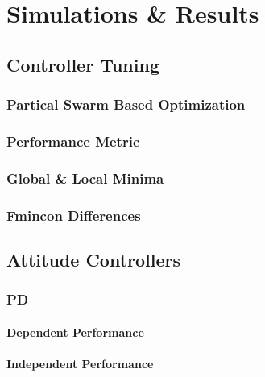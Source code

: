 \chapter{Simulations \& Results}
\label{ch:simulation}
\section{Controller Tuning}
\label{sec:simulation.tuning}
\subsection{Partical Swarm Based Optimization}
\label{subsec:simulation.tuning.pso}
\subsection{Performance Metric}
\label{subsec:simulation.tuning.metric}
\subsection{Global \& Local Minima}
\subsection{Fmincon Differences}
\section{Attitude Controllers}
\subsection{PD}
\label{subsec:simulation.attitude.pd}
\subsubsection{Dependent Performance}
\label{subsubsec:simulation.atttiude.pd.dependent}
\subsubsection{Independent Performance}
\label{subsubsec:simulation.atttiude.pd.independent}
